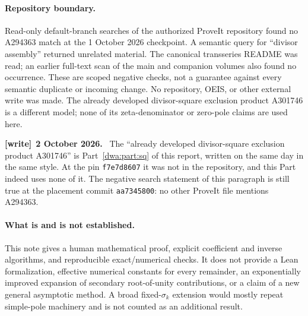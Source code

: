 \documentclass[11pt,letterpaper]{article}
\numberwithin{equation}{section}
\theoremstyle{remark}
\newenvironment{writenote}[1][]{\par\smallskip\begingroup\small
 \noindent\textbf{[write]}\if\relax\detokenize{#1}\relax\else~\textbf{#1.}\fi\ }%
 {\par\endgroup\smallskip}
\begin{document}
\paragraph{Repository boundary.}
Read-only default-branch searches of the authorized ProveIt repository found no A294363 match at the 1 October 2026 checkpoint. A semantic query for ``divisor assembly'' returned unrelated material. The canonical transseries README was read; an earlier full-text scan of the main and companion volumes also found no occurrence. These are scoped negative checks, not a guarantee against every semantic duplicate or incoming change. No repository, OEIS, or other external write was made. The already developed divisor-square exclusion product A301746 is a different model; none of its zeta-denominator or zero-pole claims are used here.
\begin{writenote}[2 October 2026]
The ``already developed divisor-square exclusion product A301746'' is Part~\ref{dwa:part:sq} of this report, written on the same day in the same style. At the pin \texttt{f7e7d8607} it was not in the repository, and this Part indeed uses none of it. The negative search statement of this paragraph is still true at the placement commit \texttt{aa7345800}: no other ProveIt file mentions A294363.
\end{writenote}

\paragraph{What is and is not established.}
This note gives a human mathematical proof, explicit coefficient and inverse algorithms, and reproducible exact/numerical checks. It does not provide a Lean formalization, effective numerical constants for every remainder, an exponentially improved expansion of secondary root-of-unity contributions, or a claim of a new general asymptotic method. A broad fixed-$\sigma_k$ extension would mostly repeat simple-pole machinery and is not counted as an additional result.
\end{document}

